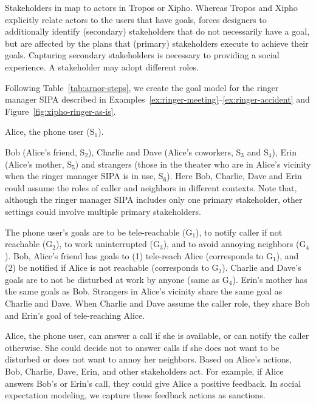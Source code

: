 Stakeholders in \frameworkA map to actors in Tropos or Xipho.
Whereas Tropos and Xipho explicitly relate actors to the users that
have goals, \frameworkA forces designers to additionally identify (secondary)
stakeholders that do not necessarily have a goal, but are affected by
the plans that (primary) stakeholders execute to achieve their
goals. Capturing secondary stakeholders is necessary to providing a 
social experience. A stakeholder may adopt different roles.

Following Table~\ref{tab:arnor-steps}, we create the goal
model for the ringer manager SIPA described in Examples~\ref{ex:ringer-meeting}--\ref{ex:ringer-accident} and Figure~\ref{fig:xipho-ringer-as-is}.

\begin{description}[leftmargin=1em]
  
  \item[Primary stakeholder.] Alice, the phone user (S$_1$). 

\item[Secondary stakeholders.] Bob (Alice's friend, S$_2$), Charlie and
Dave (Alice's coworkers, S$_3$ and S$_4$), Erin (Alice's mother, S$_5$)
and strangers (those in the theater who are in Alice's vicinity when
the ringer manager SIPA is in use, S$_6$). Here Bob, Charlie, Dave and Erin
could assume the roles of caller and neighbors in different contexts.
Note that, although the ringer manager SIPA includes only one primary
stakeholder, other settings could involve multiple primary stakeholders.

\item[Goals.] The phone user's goals are to be
tele-reachable (G$_1$), to notify caller if not reachable (G$_2$), to
work uninterrupted (G$_3$), and to avoid annoying
neighbors (G$_4$). Bob, Alice's friend has goals to (1) tele-reach Alice
(corresponds to G$_1$), and (2) be notified if Alice is not reachable
(corresponds to G$_2$). Charlie and Dave's goals are to not be disturbed
at work by anyone (same as G$_4$). Erin's mother has the same goals as
Bob. Strangers in Alice's vicinity share the same goal as Charlie and
Dave. When Charlie and Dave assume the caller role, they share Bob and 
Erin's goal of tele-reaching Alice.
  
\item[Actions.] Alice, the phone user, can answer a call if she is
available, or can notify the caller otherwise. She could
decide not to answer calls if she does not want to be disturbed or does
not want to annoy her neighbors. Based on Alice's actions, Bob, Charlie,
Dave, Erin, and other stakeholders act. For example, if Alice answers
Bob's or Erin's call, they could give Alice a positive feedback. In social
expectation modeling, we capture these feedback actions as sanctions. 


\end{description}
